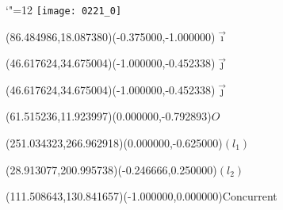 \documentclass[12pt]{article}
\begin{document}
\makeatletter%
\let\ASYencoding\f@encoding%
\let\ASYfamily\f@family%
\let\ASYseries\f@series%
\let\ASYshape\f@shape%
\makeatother%
{\catcode`"=12%
\texttt{[image: 0221\_0]}%
}%
\kern -270.803056pt%
%
%
\fontsize{12.000000}{14.400000}\selectfont%
\usefont{\ASYencoding}{\ASYfamily}{\ASYseries}{\ASYshape}%
\ASYalign(86.484986,18.087380)(-0.375000,-1.000000){$\vec{\imath}$}%
%
%
\fontsize{12.000000}{14.400000}\selectfont%
\ASYalign(46.617624,34.675004)(-1.000000,-0.452338){$\vec{\jmath}$}%
%
%
\fontsize{12.000000}{14.400000}\selectfont%
\ASYalign(46.617624,34.675004)(-1.000000,-0.452338){$\vec{\jmath}$}%
%
%
\fontsize{12.000000}{14.400000}\selectfont%
\ASYalign(61.515236,11.923997)(0.000000,-0.792893){$O$}%
%
%
\fontsize{12.000000}{14.400000}\selectfont%
\ASYalign(251.034323,266.962918)(0.000000,-0.625000){$(l_1)$}%
%
%
\fontsize{12.000000}{14.400000}\selectfont%
\ASYalign(28.913077,200.995738)(-0.246666,0.250000){$(l_2)$}%
%
%
\fontsize{12.000000}{14.400000}\selectfont%
\ASYalign(111.508643,130.841657)(-1.000000,0.000000){Concurrent}%
\end{document}
